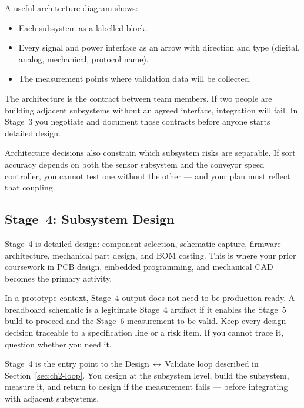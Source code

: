 A useful architecture diagram shows:
\begin{itemize}
  \item Each subsystem as a labelled block.
  \item Every signal and power interface as an arrow with direction and type
        (digital, analog, mechanical, protocol name).
  \item The measurement points where validation data will be collected.
\end{itemize}

The architecture is the contract between team members.
If two people are building adjacent subsystems without an agreed interface,
integration will fail.
In Stage~3 you negotiate and document those contracts before anyone starts
detailed design.

Architecture decisions also constrain which subsystem risks are separable.
If sort accuracy depends on both the sensor subsystem and the conveyor speed
controller, you cannot test one without the other --- and your plan must
reflect that coupling.

\subsection{Stage~4: Subsystem Design}
\label{sec:ch2-stage4}

Stage~4 is detailed design: component selection, schematic capture, firmware
architecture, mechanical part design, and BOM costing.
This is where your prior coursework in PCB design, embedded programming, and
mechanical CAD becomes the primary activity.

In a prototype context, Stage~4 output does not need to be production-ready.
A breadboard schematic is a legitimate Stage~4 artifact if it enables the
Stage~5 build to proceed and the Stage~6 measurement to be valid.
Keep every design decision traceable to a specification line or a risk item.
If you cannot trace it, question whether you need it.

Stage~4 is the entry point to the Design\,$\leftrightarrow$\,Validate loop
described in Section~\ref{sec:ch2-loop}.
You design at the subsystem level, build the subsystem, measure it, and
return to design if the measurement fails --- before integrating with
adjacent subsystems.

